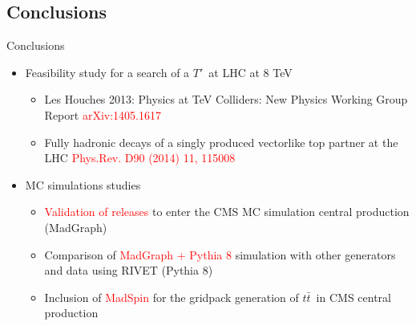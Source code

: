 \documentclass[usenames,dvipsnames]{beamer}
\newcommand{\ttbar}{$t\bar{t}$}
\newcommand{\Tp}{$T'$}
\begin{document}
\subsection{Conclusions}
\begin{frame}{Conclusions}
\vspace{-.5cm}
\begin{block}{}\scriptsize
\begin{itemize}
  \item Feasibility study for a search of a \Tp~at LHC at 8 TeV
    \begin{itemize}\scriptsize
      \item Les Houches 2013: Physics at TeV Colliders: New Physics Working Group Report \textcolor{red}{arXiv:1405.1617}
      \item Fully hadronic decays of a singly produced vectorlike top partner at the LHC \textcolor{red}{Phys.Rev. D90 (2014) 11, 115008}
    \end{itemize}
  \item MC simulations studies
    \begin{itemize}\scriptsize
          \item \textcolor{red}{Validation of releases} to enter the CMS MC simulation central production (MadGraph)
          \item Comparison of \textcolor{red}{MadGraph + Pythia 8} simulation with other generators and data using RIVET (Pythia 8)
          \item Inclusion of \textcolor{red}{MadSpin} for the gridpack generation of \ttbar~in CMS central production

\end{itemize}
\end{itemize}
\end{block}
\end{frame}
\end{document}
